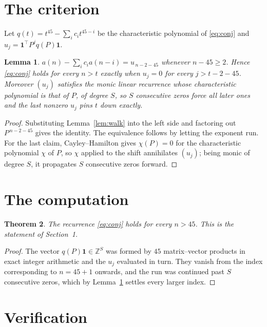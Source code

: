 \documentclass[11pt,a4paper]{article}
\theoremstyle{plain}
\newtheorem{theorem}{Theorem}
\newtheorem{lemma}[theorem]{Lemma}
\theoremstyle{definition}
\begin{document}
\section{The criterion}

Let $q(t)=t^{45}-\sum_i c_i t^{45-i}$ be the characteristic polynomial of
\eqref{eq:conj} and $u_j=\mathbf{1}^{\!\top}P^{j}q(P)\mathbf{1}$.

\begin{lemma}\label{lem:crit}
$a(n)-\sum_i c_i a(n-i)=u_{\,n-2-45}$ whenever $n-45\ge2$. Hence
\eqref{eq:conj} holds for every $n>t$ exactly when $u_j=0$ for every
$j>t-2-45$. Moreover $(u_j)$ satisfies the monic linear recurrence whose
characteristic polynomial is that of $P$, of degree $S$, so $S$ consecutive zeros force all
later ones and the last nonzero $u_j$ pins $t$ down exactly.
\end{lemma}

\begin{proof}
Substituting Lemma~\ref{lem:walk} into the left side and factoring out
$P^{\,n-2-45}$ gives the identity. The equivalence follows by letting the exponent
run. For the last claim, Cayley--Hamilton gives $\chi(P)=0$ for the characteristic
polynomial $\chi$ of $P$, so $\chi$ applied to the shift annihilates $(u_j)$; being monic of
degree $S$, it propagates $S$ consecutive zeros forward.
\end{proof}

\section{The computation}

\begin{theorem}
The recurrence \eqref{eq:conj} holds for every $n>45$. This is the statement of
Section~1.
\end{theorem}

\begin{proof}
The vector $q(P)\mathbf{1}\in\mathbb{Z}^{S}$ was formed by $45$ matrix--vector
products in exact integer arithmetic and the $u_j$ evaluated in turn. They vanish from the
index corresponding to $n=45+1$ onwards, and the run was continued past $S$ consecutive
zeros, which by Lemma~\ref{lem:crit} settles every larger index.
\end{proof}

\section{Verification}
\end{document}
